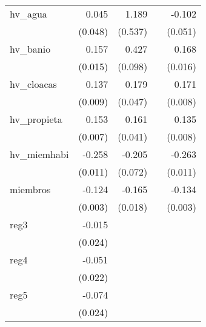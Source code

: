 {\begin{longtable}{l*{4}{D{.}{.}{-1}}}
\addlinespace
hv\_agua     &       0.045         &       1.189\sym{*}  &                     &      -0.102\sym{*}  \\
            &     (0.048)         &     (0.537)         &                     &     (0.051)         \\
\addlinespace
hv\_banio    &       0.157\sym{***}&       0.427\sym{***}&                     &       0.168\sym{***}\\
            &     (0.015)         &     (0.098)         &                     &     (0.016)         \\
\addlinespace
hv\_cloacas  &       0.137\sym{***}&       0.179\sym{***}&                     &       0.171\sym{***}\\
            &     (0.009)         &     (0.047)         &                     &     (0.008)         \\
\addlinespace
hv\_propieta &       0.153\sym{***}&       0.161\sym{***}&                     &       0.135\sym{***}\\
            &     (0.007)         &     (0.041)         &                     &     (0.008)         \\
\addlinespace
hv\_miemhabi &      -0.258\sym{***}&      -0.205\sym{**} &                     &      -0.263\sym{***}\\
            &     (0.011)         &     (0.072)         &                     &     (0.011)         \\
\addlinespace
miembros    &      -0.124\sym{***}&      -0.165\sym{***}&                     &      -0.134\sym{***}\\
            &     (0.003)         &     (0.018)         &                     &     (0.003)         \\
\addlinespace
reg3        &      -0.015         &                     &                     &                     \\
            &     (0.024)         &                     &                     &                     \\
\addlinespace
reg4        &      -0.051\sym{*}  &                     &                     &                     \\
            &     (0.022)         &                     &                     &                     \\
\addlinespace
reg5        &      -0.074\sym{**} &                     &                     &                     \\
            &     (0.024)         &                     &                     &                     \\

\end{longtable}}
